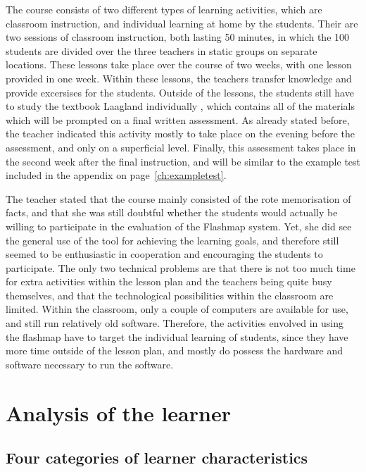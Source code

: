 The course consists of two different types of learning activities, which are classroom instruction, and individual learning at home by the students. Their are two sessions of classroom instruction, both lasting 50 minutes, in which the 100 students are divided over the three teachers in static groups on separate locations. These lessons take place over the course of two weeks, with one lesson provided in one week. Within these lessons, the teachers transfer knowledge and provide excersises for the students. Outside of the lessons, the students still have to study the textbook Laagland individually \cite{laagland}, which contains all of the materials which will be prompted on a final written assessment. As already stated before, the teacher indicated this activity mostly to take place on the evening before the assessment, and only on a superficial level. Finally, this assessment takes place in the second week after the final instruction, and will be similar to the example test included in the appendix on page~\ref{ch:exampletest}.

The teacher stated that the course mainly consisted of the rote memorisation of facts, and that she was still doubtful whether the students would actually be willing to participate in the evaluation of the Flashmap system. Yet, she did see the general use of the tool for achieving the learning goals, and therefore still seemed to be enthusiastic in cooperation and encouraging the students to participate. The only two technical problems are that there is not too much time for extra activities within the lesson plan and the teachers being quite busy themselves, and that the technological possibilities within the classroom are limited. Within the classroom, only a couple of computers are available for use, and still run relatively old software. Therefore, the activities envolved in using the flashmap have to target the individual learning of students, since they have more time outside of the lesson plan, and mostly do possess the hardware and software necessary to run the software.

\section{Analysis of the learner}


\subsection{Four categories of learner characteristics}

